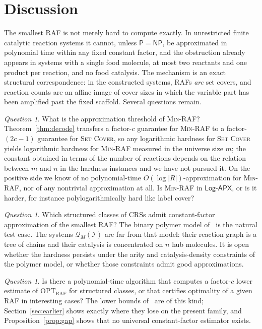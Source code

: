 \documentclass[11pt,a4paper]{article}
\theoremstyle{plain}
\theoremstyle{definition}
\theoremstyle{remark}
\newtheorem{question}[theorem]{Question}
\newcommand{\OPT}{\mathrm{OPT}}
\newcommand{\RAF}{\mathrm{RAF}}
\newcommand{\optraf}{\OPT_{\RAF}}
\newcommand{\cQ}{\mathcal{Q}}
\newcommand{\cI}{\mathcal{I}}
\newcommand{\SetCover}{\textup{\textsc{Set Cover}}}
\newcommand{\MinRAF}{\textup{\textsc{Min-RAF}}}
\newcommand{\NP}{\mathsf{NP}}
\newcommand{\Ptime}{\mathsf{P}}
\begin{document}
\section{Discussion}\label{sec:discussion}

The smallest RAF is not merely hard to compute exactly. In unrestricted finite catalytic reaction systems it cannot, unless $\Ptime=\NP$, be approximated in polynomial time within any fixed constant factor, and the obstruction already appears in systems with a single food molecule, at most two reactants and one product per reaction, and no food catalysis. The mechanism is an exact structural correspondence: in the constructed systems, RAFs \emph{are} set covers, and reaction counts are an affine image of cover sizes in which the variable part has been amplified past the fixed scaffold. Several questions remain.

\begin{question}
What is the approximation threshold of \MinRAF? Theorem~\ref{thm:decode} transfers a factor-$c$ guarantee for \MinRAF{} to a factor-$(2c-1)$ guarantee for \SetCover, so any logarithmic hardness for \SetCover{} yields logarithmic hardness for \MinRAF{} measured in the universe size $m$; the constant obtained in terms of the number of reactions depends on the relation between $m$ and $n$ in the hardness instances and we have not pursued it. On the positive side we know of no polynomial-time $O(\log|R|)$-approximation for \MinRAF, nor of any nontrivial approximation at all. Is \MinRAF{} in $\mathsf{Log}$-$\mathsf{APX}$, or is it harder, for instance polylogarithmically hard like label cover?
\end{question}

\begin{question}
Which structured classes of CRSs admit constant-factor approximation of the smallest RAF? The binary polymer model of~\cite{kauffman1986autocatalytic,hordijk2004detecting,mossel2005random,hordijk2011required} is the natural test case. The systems $\cQ_M(\cI)$ are far from that model: their reaction graph is a tree of chains and their catalysis is concentrated on $n$ hub molecules. It is open whether the hardness persists under the arity and catalysis-density constraints of the polymer model, or whether those constraints admit good approximations.
\end{question}

\begin{question}
Is there a polynomial-time algorithm that computes a factor-$c$ lower estimate of $\optraf$ for structured classes, or that certifies optimality of a given RAF in interesting cases? The lower bounds of~\cite{steel2013minimal} are of this kind; Section~\ref{sec:earlier} shows exactly where they lose on the present family, and Proposition~\ref{prop:gap} shows that no universal constant-factor estimator exists.
\end{question}
\end{document}
